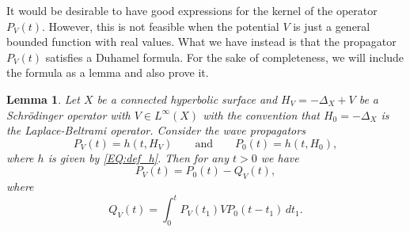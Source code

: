 \documentclass[11pt,twoside,reqno]{amsart}
\newcommand{\1}{\mathrm{\mathbf{1}}}
\numberwithin{equation}{section}
\theoremstyle{plain}
\newtheorem{lemma}[thm]{Lemma}
\theoremstyle{definition}
\theoremstyle{remark}
\begin{document}
It would be desirable to have good expressions for the kernel of the operator $ P_V(t)$. However, this is not feasible when the potential $V$ is just a general bounded function with real values. What we have instead is that the propagator $P_V(t)$ satisfies a Duhamel formula. For the sake of completeness, we will include the formula as a lemma and also prove it.  
\begin{lemma}
Let $X$ be a connected hyperbolic surface and $H_V = -\Delta_X + V$ be a Schr\"odinger operator with $V\in L^\infty(X)$ with the convention that $H_0=-\Delta_X$ is the Laplace-Beltrami operator. Consider the wave propagators 
\begin{equation*}
    P_V(t) = h(t,H_V) \qquad\text{and}\qquad  P_0(t) = h(t,H_0),
\end{equation*}
where $h$ is given by \eqref{EQ:def_h}. Then for any $t>0$ we have 
\begin{equation}\label{Duhamel_formula_main}
    P_V(t) = P_0(t) - Q_V(t),
\end{equation}
where 
\begin{equation}\label{Duhamel_formula_main_Q}
    Q_V(t) =  \int_{0}^{t} P_V(t_1) V P_0(t-t_1) \, dt_1.
\end{equation}
\end{lemma}
\end{document}
